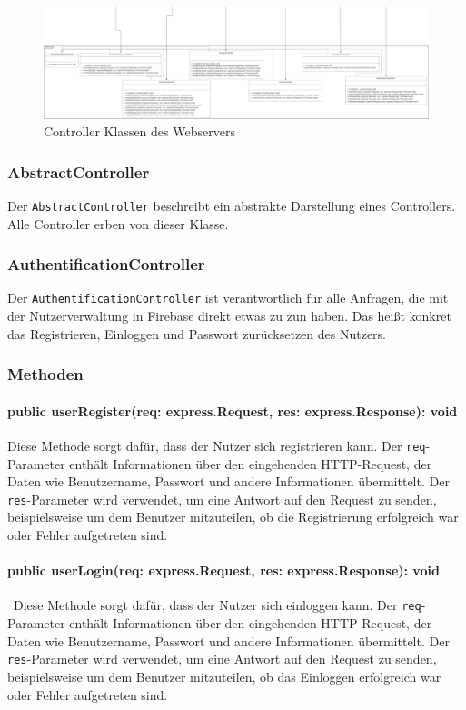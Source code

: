 \documentclass{entwurfsheft}
\begin{document}
\begin{figure}[htp]
    \centering
    \includegraphics[width = 1\textwidth]{images/webserver/controller.pdf}
    \caption{Controller Klassen des Webservers}
    \label{fig:controller}
\end{figure}

\subsubsection{AbstractController}\label{sec:AbstractController}
Der \texttt{AbstractController} beschreibt ein abstrakte Darstellung eines Controllers. Alle Controller erben von dieser Klasse.

\subsubsection{AuthentificationController}\label{sec:AuthentificationController}
Der \texttt{AuthentificationController} ist verantwortlich für alle Anfragen, die mit der Nutzerverwaltung in Firebase direkt etwas zu zun haben. Das heißt konkret das Registrieren, Einloggen und Passwort zurücksetzen des Nutzers.
\subsubsection*{Methoden}
\paragraph{public userRegister(req: express.Request, res: express.Response): void}
Diese Methode sorgt dafür, dass der Nutzer sich registrieren kann. Der \texttt{req}-Parameter enthält Informationen über den eingehenden HTTP-Request, der Daten wie Benutzername, Passwort und andere Informationen übermittelt. Der \texttt{res}-Parameter wird verwendet, um eine Antwort auf den Request zu senden, beispielsweise um dem Benutzer mitzuteilen, ob die Registrierung erfolgreich war oder Fehler aufgetreten sind.
\paragraph{public userLogin(req: express.Request, res: express.Response): void}\
Diese Methode sorgt dafür, dass der Nutzer sich einloggen kann. Der \texttt{req}-Parameter enthält Informationen über den eingehenden HTTP-Request, der Daten wie Benutzername, Passwort und andere Informationen übermittelt. Der \texttt{res}-Parameter wird verwendet, um eine Antwort auf den Request zu senden, beispielsweise um dem Benutzer mitzuteilen, ob das Einloggen erfolgreich war oder Fehler aufgetreten sind. 
\end{document}
